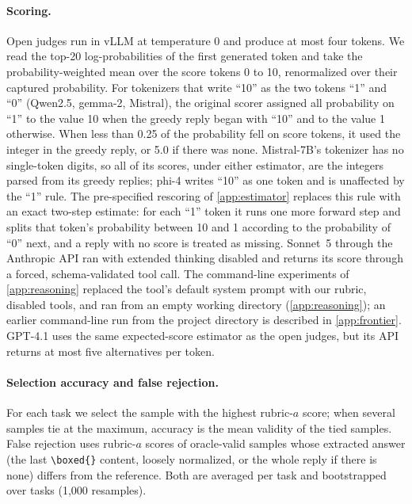 \paragraph{Scoring.}
Open judges run in vLLM at temperature 0 and produce at most four tokens. We read the top-20 log-probabilities of the first generated token and take the probability-weighted mean over the score tokens 0 to 10, renormalized over their captured probability. For tokenizers that write ``10'' as the two tokens ``1'' and ``0'' (Qwen2.5, gemma-2, Mistral), the original scorer assigned all probability on ``1'' to the value 10 when the greedy reply began with ``10'' and to the value 1 otherwise. When less than 0.25 of the probability fell on score tokens, it used the integer in the greedy reply, or 5.0 if there was none. Mistral-7B's tokenizer has no single-token digits, so all of its scores, under either estimator, are the integers parsed from its greedy replies; phi-4 writes ``10'' as one token and is unaffected by the ``1'' rule. The pre-specified rescoring of \cref{app:estimator} replaces this rule with an exact two-step estimate: for each ``1'' token it runs one more forward step and splits that token's probability between 10 and 1 according to the probability of ``0'' next, and a reply with no score is treated as missing.
Sonnet~5 through the Anthropic API ran with extended thinking disabled and returns its score through a forced, schema-validated tool call. The command-line experiments of \cref{app:reasoning} replaced the tool's default system prompt with our rubric, disabled tools, and ran from an empty working directory (\cref{app:reasoning}); an earlier command-line run from the project directory is described in \cref{app:frontier}. GPT-4.1 uses the same expected-score estimator as the open judges, but its API returns at most five alternatives per token.

\paragraph{Selection accuracy and false rejection.}
For each task we select the sample with the highest rubric-$a$ score; when several samples tie at the maximum, accuracy is the mean validity of the tied samples. False rejection uses rubric-$a$ scores of oracle-valid samples whose extracted answer (the last \texttt{\textbackslash boxed\{\}} content, loosely normalized, or the whole reply if there is none) differs from the reference. Both are averaged per task and bootstrapped over tasks (1,000 resamples).

